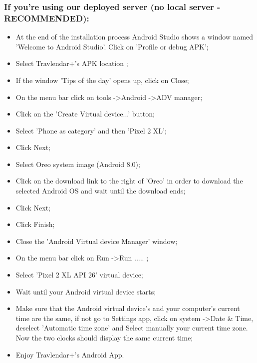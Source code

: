 \subsubsection{If you're using our deployed server (no local server - RECOMMENDED):}
\begin{itemize}
	\item At the end of the installation process Android Studio shows a window named 'Welcome to Android Studio'. Click on 'Profile or debug APK';
	\item Select Travlendar+'s APK location ;
	\item If the window 'Tips of the day' opens up, click on Close;
	\item On the menu bar click on tools -\textgreater Android -\textgreater ADV manager;
	\item Click on the 'Create Virtual device...' button;
	\item Select 'Phone as category' and then 'Pixel 2 XL';
	\item Click Next;
	\item Select Oreo system image (Android 8.0);
	\item Click on the download link to the right of 'Oreo' in order to download the selected Android OS and wait until the download ends; 
	\item Click Next;
	\item Click Finish;
	\item Close the 'Android Virtual device Manager' window;
	\item On the menu bar click on Run -\textgreater Run ..... ;
	\item Select 'Pixel 2 XL API 26' virtual device;
	\item Wait until your Android virtual device starts;
	\item Make sure that the Android virtual device's and your computer's current time are the same, if not go to Settings app, click on system -\textgreater Date \& Time, deselect 'Automatic time zone' and Select manually your current time zone. Now the two clocks should display the same current time;
	\item Enjoy Travlendar+'s Android App.	
\end{itemize}

